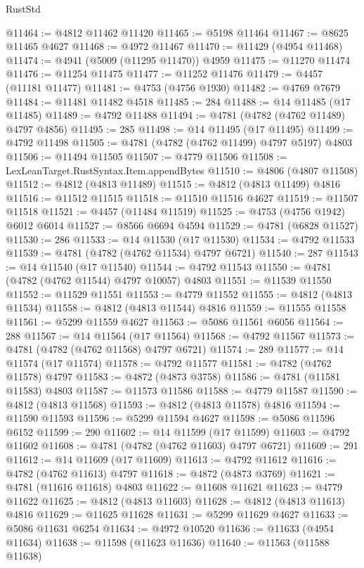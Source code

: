 \begin{lexlean}{RustStd}
\begin{coremodule}
@11464 := @4812 @11462 @11420
@11465 := @5198 @11464
@11467 := @8625 @11465 @4627
@11468 := @4972 @11467
@11470 := @11429 (@4954 @11468)
@11474 := @4941 (@5009 (@11295 @11470)) @4959
@11475 := @11270 @11474
@11476 := @11254 @11475
@11477 := @11252 @11476
@11479 := @4457 (@11181 @11477)
@11481 := @4753 (@4756 @1930)
@11482 := @4769 @7679
@11484 := @11481 @11482 @4518
@11485 := 284
@11488 := @14 @11485 (@17 @11485)
@11489 := @4792 @11488
@11494 := @4781 (@4782 (@4762 @11489) @4797 @4856)
@11495 := 285
@11498 := @14 @11495 (@17 @11495)
@11499 := @4792 @11498
@11505 := @4781 (@4782 (@4762 @11499) @4797 @5197) @4803
@11506 := @11494 @11505
@11507 := @4779 @11506
@11508 := LexLeanTarget.RustSyntax.Item.appendBytes
@11510 := @4806 (@4807 @11508)
@11512 := @4812 (@4813 @11489)
@11515 := @4812 (@4813 @11499) @4816
@11516 := @11512 @11515
@11518 := @11510 @11516 @4627
@11519 := @11507 @11518
@11521 := @4457 (@11484 @11519)
@11525 := @4753 (@4756 @1942) @6012 @6014
@11527 := @8566 @6694 @4594
@11529 := @4781 (@6828 @11527)
@11530 := 286
@11533 := @14 @11530 (@17 @11530)
@11534 := @4792 @11533
@11539 := @4781 (@4782 (@4762 @11534) @4797 @6721)
@11540 := 287
@11543 := @14 @11540 (@17 @11540)
@11544 := @4792 @11543
@11550 := @4781 (@4782 (@4762 @11544) @4797 @10057) @4803
@11551 := @11539 @11550
@11552 := @11529 @11551
@11553 := @4779 @11552
@11555 := @4812 (@4813 @11534)
@11558 := @4812 (@4813 @11544) @4816
@11559 := @11555 @11558
@11561 := @5299 @11559 @4627
@11563 := @5086 @11561 @6056
@11564 := 288
@11567 := @14 @11564 (@17 @11564)
@11568 := @4792 @11567
@11573 := @4781 (@4782 (@4762 @11568) @4797 @6721)
@11574 := 289
@11577 := @14 @11574 (@17 @11574)
@11578 := @4792 @11577
@11581 := @4782 (@4762 @11578) @4797
@11583 := @4872 (@4873 @3758)
@11586 := @4781 (@11581 @11583) @4803
@11587 := @11573 @11586
@11588 := @4779 @11587
@11590 := @4812 (@4813 @11568)
@11593 := @4812 (@4813 @11578) @4816
@11594 := @11590 @11593
@11596 := @5299 @11594 @4627
@11598 := @5086 @11596 @6152
@11599 := 290
@11602 := @14 @11599 (@17 @11599)
@11603 := @4792 @11602
@11608 := @4781 (@4782 (@4762 @11603) @4797 @6721)
@11609 := 291
@11612 := @14 @11609 (@17 @11609)
@11613 := @4792 @11612
@11616 := @4782 (@4762 @11613) @4797
@11618 := @4872 (@4873 @3769)
@11621 := @4781 (@11616 @11618) @4803
@11622 := @11608 @11621
@11623 := @4779 @11622
@11625 := @4812 (@4813 @11603)
@11628 := @4812 (@4813 @11613) @4816
@11629 := @11625 @11628
@11631 := @5299 @11629 @4627
@11633 := @5086 @11631 @6254
@11634 := @4972 @10520
@11636 := @11633 (@4954 @11634)
@11638 := @11598 (@11623 @11636)
@11640 := @11563 (@11588 @11638)

\end{coremodule}
\end{lexlean}
